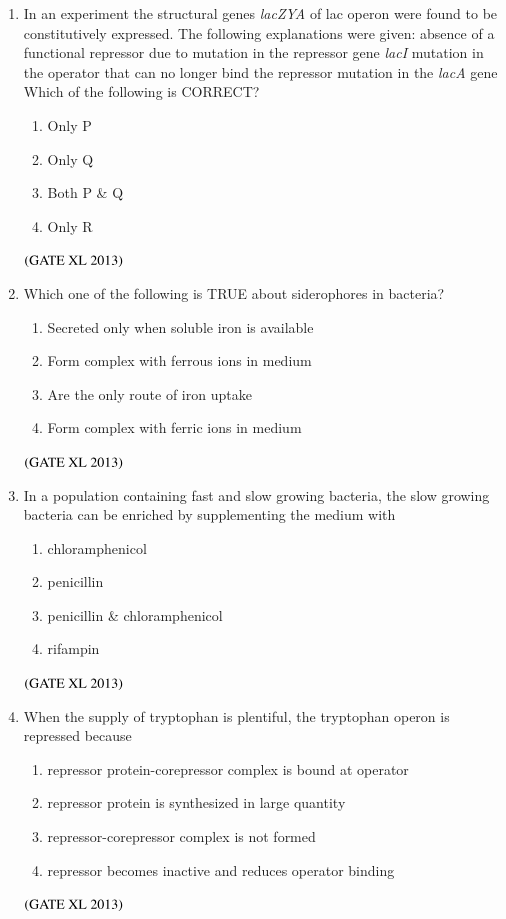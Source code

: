 \documentclass[journal]{IEEEtran}
\begin{document}
\begin{enumerate}
\begin{enumerate}
\item In an experiment the structural genes \textit{lacZYA} of lac operon were found to be constitutively expressed. The following explanations were given:  
 absence of a functional repressor due to mutation in the repressor gene \textit{lacI}  
 mutation in the operator that can no longer bind the repressor  
 mutation in the \textit{lacA} gene  
Which of the following is CORRECT?
\begin{enumerate}
\item Only P
\item Only Q
\item Both P \& Q
\item Only R
\end{enumerate}
\hfill $\left(\text{GATE XL 2013}\right)$

\item Which one of the following is TRUE about siderophores in bacteria?
\begin{enumerate}
\item Secreted only when soluble iron is available
\item Form complex with ferrous ions in medium
\item Are the only route of iron uptake
\item Form complex with ferric ions in medium
\end{enumerate}
\hfill $\left(\text{GATE XL 2013}\right)$

\item In a population containing fast and slow growing bacteria, the slow growing bacteria can be enriched by supplementing the medium with
\begin{enumerate}
\item chloramphenicol
\item penicillin
\item penicillin \& chloramphenicol
\item rifampin
\end{enumerate}
\hfill $\left(\text{GATE XL 2013}\right)$

\item When the supply of tryptophan is plentiful, the tryptophan operon is repressed because
\begin{enumerate}
\item repressor protein-corepressor complex is bound at operator
\item repressor protein is synthesized in large quantity
\item repressor-corepressor complex is not formed
\item repressor becomes inactive and reduces operator binding
\end{enumerate}
\hfill $\left(\text{GATE XL 2013}\right)$


\end{enumerate}
\end{enumerate}
\end{document}
